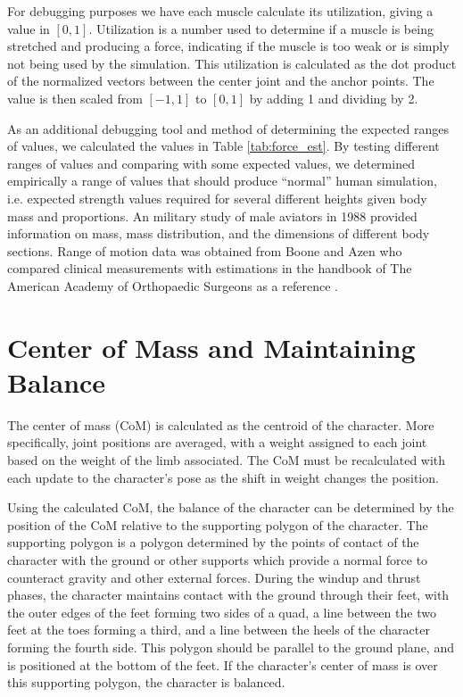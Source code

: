 For debugging purposes we have each muscle calculate its utilization, giving a value in $[0,1]$.  Utilization is a number used to determine if a muscle is being stretched and producing a force, indicating if the muscle is too weak or is simply not being used by the simulation.  This utilization is calculated as the dot product of the normalized vectors between the center joint and the anchor points.  The value is then scaled from $[-1, 1]$ to $[0,1]$ by adding 1 and dividing by 2.

As an additional debugging tool and method of determining the expected ranges of values, we calculated the values in Table \ref{tab:force_est}.  By testing different ranges of values and comparing with some expected values, we determined empirically a range of values that should produce ``normal'' human simulation, i.e. expected strength values required for several different heights given body mass and proportions.  An military study of male aviators in 1988 provided information on mass, mass distribution, and the dimensions of different body sections.  Range of motion data was obtained from Boone and Azen who compared clinical measurements with estimations in the handbook of The American Academy of Orthopaedic Surgeons as a reference \cite{Boone756}.


\section{Center of Mass and Maintaining Balance}
\label{section:com}
The center of mass (CoM) is calculated as the centroid of the character.  More specifically, joint positions are averaged, with a weight assigned to each joint based on the weight of the limb associated.  The CoM must be recalculated with each update to the character's pose as the shift in weight changes the position.

Using the calculated CoM, the balance of the character can be determined by the position of the CoM relative to the supporting polygon of the character.  The supporting polygon is a polygon determined by the points of contact of the character with the ground or other supports which provide a normal force to counteract gravity and other external forces.  During the windup and thrust phases, the character maintains contact with the ground through their feet, with the outer edges of the feet forming two sides of a quad, a line between the two feet at the toes forming a third, and a line between the heels of the character forming the fourth side.  This polygon should be parallel to the ground plane, and is positioned at the bottom of the feet.  If the character's center of mass is over this supporting polygon, the character is balanced.

